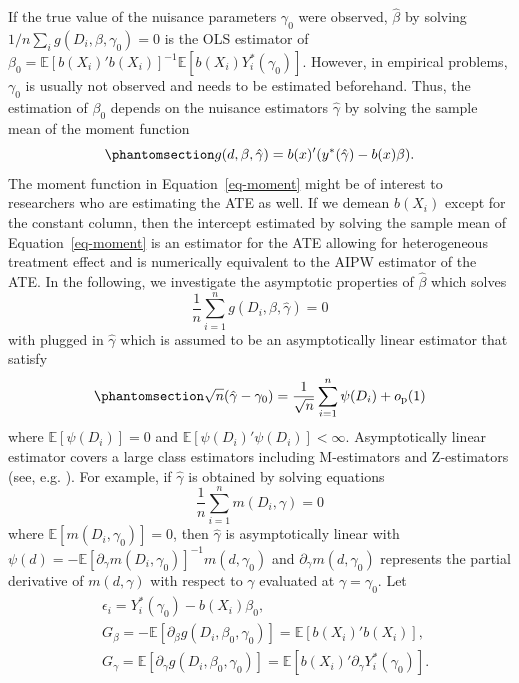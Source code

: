 \documentclass[
  12pt,
  12pt]{article}
\numberwithin{equation}{section}
\theoremstyle{definition}
\theoremstyle{plain}
\theoremstyle{plain}
\theoremstyle{remark}
\begin{document}
If the true value of the nuisance parameters \(\gamma_0\) were observed,
\(\hat\beta\) by solving \(1/n\sum_i g(D_i, \beta, \gamma_0) = 0\) is
the OLS estimator of
\(\beta_0 = \mathbb{E}[b(X_i)'b(X_i)]^{-1}\mathbb{E}[b(X_i)Y^*_i(\gamma_0)]\).
However, in empirical problems, \(\gamma_0\) is usually not observed and
needs to be estimated beforehand. Thus, the estimation of \(\beta_0\)
depends on the nuisance estimators \(\hat\gamma\) by solving the sample
mean of the moment function
\begin{equation}\phantomsection\label{eq-moment}{
g(d, \beta, \hat\gamma) = b(x)'(y^*(\hat\gamma) - b(x)\beta).
}\end{equation} The moment function in Equation~\ref{eq-moment} might be
of interest to researchers who are estimating the ATE as well. If we
demean \(b(X_i)\) except for the constant column, then the intercept
estimated by solving the sample mean of Equation~\ref{eq-moment} is an
estimator for the ATE allowing for heterogeneous treatment effect and is
numerically equivalent to the AIPW estimator of the ATE. In the
following, we investigate the asymptotic properties of \(\hat\beta\)
which solves \[
\frac1n \sum_{i = 1}^n g(D_i, \beta, \hat\gamma) = 0
\] with plugged in \(\hat\gamma\) which is assumed to be an
asymptotically linear estimator that satisfy
\begin{equation}\phantomsection\label{eq-asymlinear}{
\sqrt{n}(\hat\gamma - \gamma_0) = \frac{1}{\sqrt{n}}\sum_{i = 1}^{n}\psi(D_i) + o_\text{p}(1)
}\end{equation} where \(\mathbb{E}[\psi(D_i)] = 0\) and
\(\mathbb{E}[\psi(D_i)'\psi(D_i)] < \infty\). Asymptotically linear
estimator covers a large class estimators including M-estimators and
Z-estimators (see, e.g. \citet{ichimura2022influence}). For example, if
\(\hat\gamma\) is obtained by solving equations \[
\frac1n \sum_{i = 1}^n m(D_i, \gamma) = 0
\] where \(\mathbb{E}[m(D_i, \gamma_0)] = 0\), then \(\hat\gamma\) is
asymptotically linear with
\(\psi(d) = -\mathbb{E}[\partial_\gamma m(D_i, \gamma_0)]^{-1}m(d, \gamma_0)\)
and \(\partial_\gamma m(d, \gamma_0)\) represents the partial derivative
of \(m(d, \gamma)\) with respect to \(\gamma\) evaluated at
\(\gamma = \gamma_0\). Let \[
\begin{aligned}
&\epsilon_i = Y_i^*(\gamma_0) - b(X_i)\beta_0, \\
&G_\beta = -\mathbb{E}[\partial_\beta g(D_i, \beta_0, \gamma_0)] = \mathbb{E}[b(X_i)'b(X_i)], \\
&G_\gamma = \mathbb{E}[\partial_\gamma g(D_i, \beta_0, \gamma_0)] = \mathbb{E}[b(X_i)'\partial_\gamma Y_i^*(\gamma_0)].
\end{aligned}
\]
\end{document}
